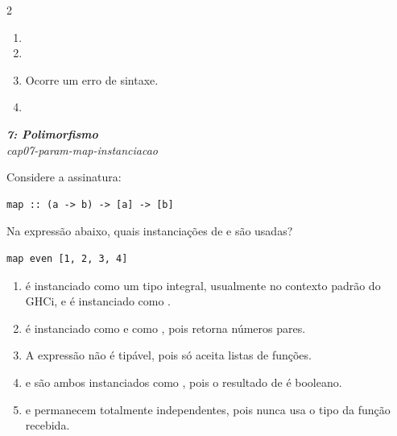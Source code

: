 \documentclass[a4paper,10pt,brazil]{article}
\begin{document}
\begin{multicols}{2}
\begin{enumerate}
  \item {}

  \item {}

  \item Ocorre um erro de sintaxe.

  \item {}


\end{enumerate}

\begin{flushright}
  \footnotesize
  \textit{\textbf{7: Polimorfismo}}\\
  \textit{cap07-param-map-instanciacao}\\

\end{flushright}
Considere a assinatura:

\begin{verbatim}
map :: (a -> b) -> [a] -> [b]
\end{verbatim}

Na expressão abaixo, quais instanciações de  e  são usadas?

\begin{verbatim}
map even [1, 2, 3, 4]
\end{verbatim}

\begin{enumerate}
  \item {} é instanciado como um tipo integral, usualmente  no contexto padrão do GHCi, e  é instanciado como .
  \item {} é instanciado como  e  como , pois  retorna números pares.
  \item A expressão não é tipável, pois  só aceita listas de funções.
  \item {} e  são ambos instanciados como , pois o resultado de  é booleano.
  \item {} e  permanecem totalmente independentes, pois  nunca usa o tipo da função recebida.

\end{enumerate}


\end{multicols}
\end{document}
